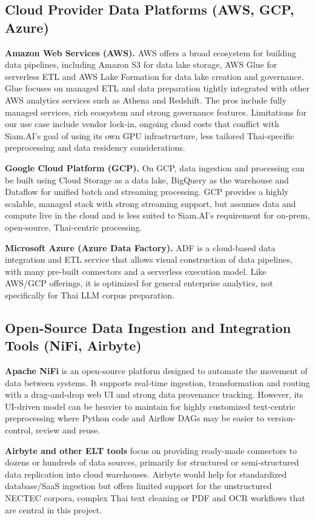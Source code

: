 \documentclass[12pt,oneside,openright,a4paper]{cpe-english-project}
\begin{document}
\subsection{Cloud Provider Data Platforms (AWS, GCP, Azure)}

\textbf{Amazon Web Services (AWS).} AWS offers a broad ecosystem for building data pipelines, including Amazon S3 for data lake storage, AWS Glue for serverless ETL and AWS Lake Formation for data lake creation and governance. Glue focuses on managed ETL and data preparation tightly integrated with other AWS analytics services such as Athena and Redshift. The pros include fully managed services, rich ecosystem and strong governance features. Limitations for our use case include vendor lock-in, ongoing cloud costs that conflict with Siam.AI's goal of using its own GPU infrastructure, less tailored Thai-specific preprocessing and data residency considerations.

\textbf{Google Cloud Platform (GCP).} On GCP, data ingestion and processing can be built using Cloud Storage as a data lake, BigQuery as the warehouse and Dataflow for unified batch and streaming processing. GCP provides a highly scalable, managed stack with strong streaming support, but assumes data and compute live in the cloud and is less suited to Siam.AI's requirement for on-prem, open-source, Thai-centric processing.

\textbf{Microsoft Azure (Azure Data Factory).} ADF is a cloud-based data integration and ETL service that allows visual construction of data pipelines, with many pre-built connectors and a serverless execution model. Like AWS/GCP offerings, it is optimized for general enterprise analytics, not specifically for Thai LLM corpus preparation.

\subsection{Open-Source Data Ingestion and Integration Tools (NiFi, Airbyte)}

\textbf{Apache NiFi} is an open-source platform designed to automate the movement of data between systems. It supports real-time ingestion, transformation and routing with a drag-and-drop web UI and strong data provenance tracking. However, its UI-driven model can be heavier to maintain for highly customized text-centric preprocessing where Python code and Airflow DAGs may be easier to version-control, review and reuse.

\textbf{Airbyte and other ELT tools} focus on providing ready-made connectors to dozens or hundreds of data sources, primarily for structured or semi-structured data replication into cloud warehouses. Airbyte would help for standardized database/SaaS ingestion but offers limited support for the unstructured NECTEC corpora, complex Thai text cleaning or PDF and OCR workflows that are central in this project.
\end{document}
